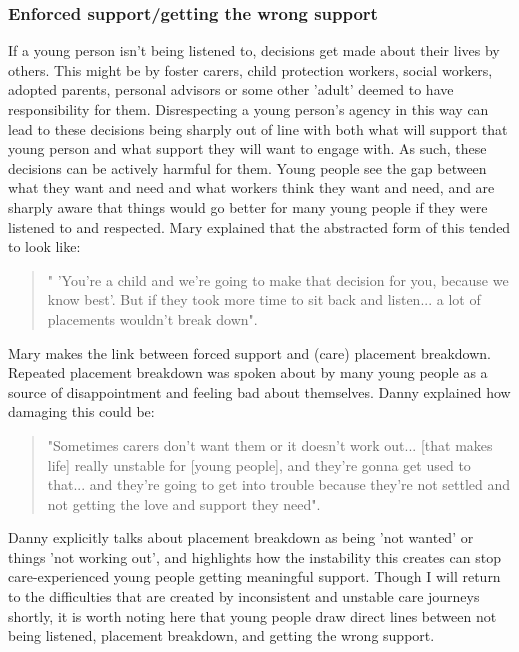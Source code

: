 \subsubsection{Enforced support/getting the wrong support}
If a young person isn't being listened to, decisions get made about their lives by others. This might be by foster carers, child protection workers, social workers, adopted parents, personal advisors or some other 'adult' deemed to have responsibility for them. Disrespecting a young person's agency in this way can lead to these decisions being sharply out of line with both what will support that young person and what support they will want to engage with. As such, these decisions can be actively harmful for them. Young people see the gap between what they want and need and what workers think they want and need, and are sharply aware that things would go better for many young people if they were listened to and respected. Mary explained that the abstracted form of this tended to look like:
\begin{quote}
" 'You're a child and we're going to make that decision for you, because we know best'. But if they took more time to sit back and listen... a lot of placements wouldn't break down".
\end{quote}
Mary makes the link between forced support and (care) placement breakdown. Repeated placement breakdown was spoken about by many young people as a source of disappointment and feeling bad about themselves. Danny explained how damaging this could be:
\begin{quote}
"Sometimes carers don't want them or it doesn't work out... [that makes life] really unstable for [young people], and they're gonna get used to that... and they're going to get into trouble because they're not settled and not getting the love and support they need".
\end{quote}
Danny explicitly talks about placement breakdown as being 'not wanted' or things 'not working out', and highlights how the instability this creates can stop care-experienced young people getting meaningful support. Though I will return to the difficulties that are created by inconsistent and unstable care journeys shortly, it is worth noting here that young people draw direct lines between not being listened, placement breakdown, and getting the wrong support.


